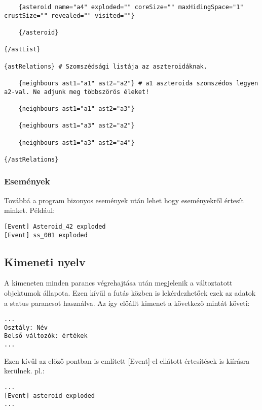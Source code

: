 \documentclass[../../projlab]{subfiles}
\begin{document}
\begin{verbatim}
	{asteroid name="a4" exploded="" coreSize="" maxHidingSpace="1" crustSize="" revealed="" visited=""}
	
	{/asteroid}

{/astList}

{astRelations} # Szomszédsági listája az aszteroidáknak.

	{neighbours ast1="a1" ast2="a2"} # a1 aszteroida szomszédos legyen a2-val. Ne adjunk meg többszörös éleket!
	
	{neighbours ast1="a1" ast2="a3"}
	
	{neighbours ast1="a3" ast2="a2"}
	
	{neighbours ast1="a3" ast2="a4"}

{/astRelations}
\end{verbatim}


\subsubsection{Események}
Továbbá a program bizonyos események után lehet hogy eseményekről értesít minket.
Például:
\begin{verbatim}
[Event] Asteroid_42 exploded
[Event] ss_001 exploded
\end{verbatim}


\subsection{Kimeneti nyelv}

A kimeneten minden parancs végrehajtása után megjelenik a változtatott objektumok állapota. Ezen kívűl a futás közben is lekérdezhetőek ezek az adatok a status parancsot használva.
Az így előállt kimenet a következő mintát követi:
\begin{verbatim}
...
Osztály: Név
Belső változók: értékek
...
\end{verbatim}

Ezen kívűl az előző pontban is említett [Event]-el ellátott értesítések is kiírásra kerülnek.
pl.:
\begin{verbatim}
...
[Event] asteroid exploded
...
\end{verbatim}
\end{document}
